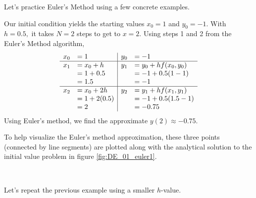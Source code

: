 Let's practice Euler's Method using a few concrete examples.\\

{Our initial condition yields the starting values $x_0 = 1$ and $y_0 = -1$.  With $h = 0.5,$ it takes $N=2$ steps to get to $x=2.$  Using steps 1 and 2 from the Euler's Method algorithm,
\[
\begin{array}{rl | rl}
x_0  &= 1			& 	y_0	&= -1\\ \hline
x_1 	&= x_0 + h 	& 	y_1 	&= y_0 + hf(x_0,y_0)\\
	&= 1 + 0.5	 	&		&= -1 + 0.5(1 - 1)\\
	&= 1.5		&		&= -1\\ \hline
x_2	&= x_0 + 2h	&	y_2	&= y_1 + hf(x_1,y_1)\\
	&= 1 + 2(0.5)	&		&= -1 + 0.5(1.5 -1)\\
	&= 2			&		&= -0.75
\end{array}
\]
Using Euler's method, we find the approximate $y(2) \approx -0.75.$

To help visualize the Euler's method approximation, these three points (connected by line segments) are plotted along with the analytical solution to the initial value problem in figure \ref{fig:DE_01_euler1}.
}\\


Let's repeat the previous example using a smaller $h$-value.\\

